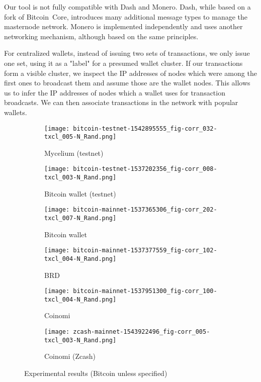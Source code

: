 Our tool is not fully compatible with Dash and Monero.
Dash, while based on a fork of Bitcoin~Core, introduces many additional message types to manage the masternode network.
Monero is implemented independently and uses another networking mechanism, although based on the same principles.

For centralized wallets, instead of issuing two sets of transactions, we only issue one set, using it as a "label" for a presumed wallet cluster.
If our transactions form a visible cluster, we inspect the IP addresses of nodes which were among the first ones to broadcast them and assume those are the wallet nodes.
This allows us to infer the IP addresses of nodes which a wallet uses for transaction broadcasts.
We can then associate transactions in the network with popular wallets.

\begin{figure}
	\centering
	\begin{subfigure}{.5\textwidth}
		\centering
		\texttt{[image: bitcoin-testnet-1542895555\_fig-corr\_032-txcl\_005-N\_Rand.png]}
		\caption{Mycelium (testnet)}
	\end{subfigure}%
	\begin{subfigure}{.5\textwidth}
		\centering
		\texttt{[image: bitcoin-testnet-1537202356\_fig-corr\_008-txcl\_003-N\_Rand.png]}
		\caption{Bitcoin wallet (testnet)}
	\end{subfigure}
	\begin{subfigure}{.5\textwidth}
		\centering
		\texttt{[image: bitcoin-mainnet-1537365306\_fig-corr\_202-txcl\_007-N\_Rand.png]}
		\caption{Bitcoin wallet}
	\end{subfigure}%
	\begin{subfigure}{.5\textwidth}
		\centering
		\texttt{[image: bitcoin-mainnet-1537377559\_fig-corr\_102-txcl\_004-N\_Rand.png]}
		\caption{BRD}
	\end{subfigure}
	\begin{subfigure}{.5\textwidth}
		\centering
		\texttt{[image: bitcoin-mainnet-1537951300\_fig-corr\_100-txcl\_004-N\_Rand.png]}
		\caption{Coinomi}
	\end{subfigure}%
	\begin{subfigure}{.5\textwidth}
		\centering
		\texttt{[image: zcash-mainnet-1543922496\_fig-corr\_005-txcl\_003-N\_Rand.png]}
		\caption{Coinomi (Zcash)}
	\end{subfigure}
	\caption[short]{Experimental results (Bitcoin unless specified)}
	\label{fig:clustering-all}
\end{figure}


